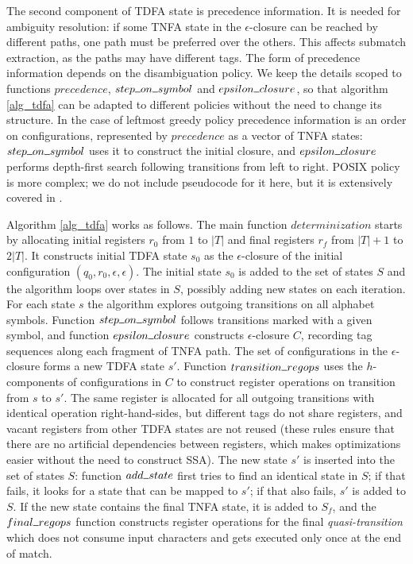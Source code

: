 \documentclass[]{article}
\newcommand{\Xund}{\rule{.5em}{.5pt}}
\begin{document}
The second component of TDFA state is precedence information.
It is needed for ambiguity resolution:
if some TNFA state in the $\epsilon$-closure can be reached by different paths, one path must be preferred over the others.
This affects submatch extraction, as the paths may have different tags.
The form of precedence information depends on the disambiguation policy.
We keep the details scoped to functions $precedence$, $step \Xund on \Xund symbol$ and $epsilon \Xund closure$,
so that algorithm \ref{alg_tdfa} can be adapted to different policies without the need to change its structure.
%
In the case of leftmost greedy policy precedence information is an order on configurations,
represented by $precedence$ as a vector of TNFA states:
$step \Xund on \Xund symbol$ uses it to construct the initial closure,
and $epsilon \Xund closure$ performs depth-first search following transitions from left to right.
%
POSIX policy is more complex; we do not include pseudocode for it here, but it is extensively covered in \cite{BorTro19}.
\medskip

Algorithm \ref{alg_tdfa} works as follows.
The main function $determinization$ starts by allocating initial registers $r_0$ from $1$ to $|T|$ and final registers $r_{\!f}$ from $|T| + 1$ to $2|T|$.
It constructs initial TDFA state $s_0$ as the $\epsilon$-closure of the initial configuration $(q_0, r_0, \epsilon, \epsilon)$.
The initial state $s_0$ is added to the set of states $S$ and the algorithm loops over states in $S$, possibly adding new states on each iteration.
For each state $s$ the algorithm explores outgoing transitions on all alphabet symbols.
Function $step \Xund on \Xund symbol$ follows transitions marked with a given symbol,
and  function $epsilon \Xund closure$ constructs $\epsilon$-closure $C$, recording tag sequences along each fragment of TNFA path.
%
The set of configurations in the $\epsilon$-closure forms a new TDFA state $s'$.
Function $transition \Xund regops$ uses the $h$-components of configurations in $C$ to construct register operations on transition from $s$ to $s'$.
%
The same register is allocated for all outgoing transitions with identical operation right-hand-sides,
but different tags do not share registers,
and vacant registers from other TDFA states are not reused
(these rules ensure that there are no artificial dependencies between registers, which makes optimizations easier without the need to construct SSA).
%
The new state $s'$ is inserted into the set of states $S$:
function $add \Xund state$ first tries to find an identical state in $S$;
if that fails, it looks for a state that can be mapped to $s'$;
if that also fails, $s'$ is added to $S$.
%
If the new state contains the final TNFA state, it is added to $S_f$,
and the $final \Xund regops$ function constructs register operations for the final \emph{quasi-transition}
which does not consume input characters and gets executed only once at the end of match.
\medskip
\end{document}

